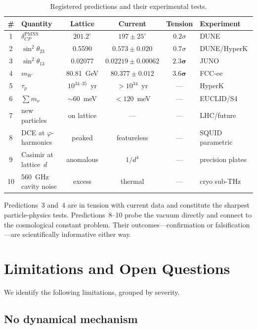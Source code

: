 \documentclass[12pt,a4paper]{article}
\newcommand{\vp}{\varphi}
\begin{document}
\begin{table}[H]
\centering
\caption{Registered predictions and their experimental tests.}
\label{tab:predictions}
\begin{tabular}{@{}clcccl@{}}
\toprule
\# & Quantity & Lattice & Current & Tension & Experiment \\
\midrule
1 & $\delta_{CP}^{\mathrm{PMNS}}$ & $201.2^\circ$ & $197 \pm 25^\circ$ & $0.2\sigma$ & DUNE \\
2 & $\sin^2\theta_{23}$ & 0.5590 & $0.573 \pm 0.020$ & $0.7\sigma$ & DUNE/HyperK \\
3 & $\sin^2\theta_{13}$ & 0.02077 & $0.02219 \pm 0.00062$ & $\mathbf{2.3\sigma}$ & JUNO \\
4 & $m_W$ & 80.81~GeV & $80.377 \pm 0.012$ & $\mathbf{3.6\sigma}$ & FCC-ee \\
5 & $\tau_p$ & $10^{34\text{--}35}$~yr & $> 10^{34}$~yr & --- & HyperK \\
6 & $\sum m_\nu$ & $\sim$60~meV & $< 120$~meV & --- & EUCLID/S4 \\
7 & new particles & on lattice & --- & --- & LHC/future \\
8 & DCE at $\vp$-harmonics & peaked & featureless & --- & SQUID parametric \\
9 & Casimir at lattice~$d$ & anomalous & $1/d^4$ & --- & precision plates \\
10 & 560~GHz cavity noise & excess & thermal & --- & cryo sub-THz \\
\bottomrule
\end{tabular}
\end{table}

Predictions~3 and~4 are in tension with current data and constitute the
sharpest particle-physics tests.  Predictions~8--10 probe the vacuum
directly and connect to the cosmological constant problem.  Their
outcomes---confirmation or falsification---are scientifically informative
either way.


\section{Limitations and Open Questions}
\label{sec:limitations}

We identify the following limitations, grouped by severity.

\subsection{No dynamical mechanism}
\label{sec:no_mechanism}
\end{document}
